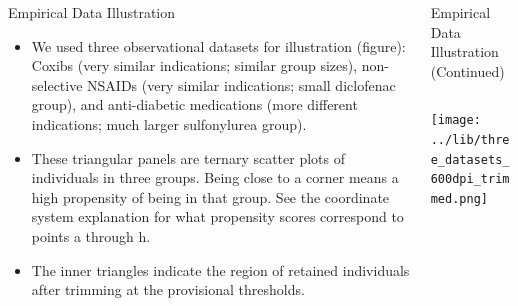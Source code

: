 \documentclass[final]{beamer}
\begin{document}
\begin{frame}[label={sec:org6cddcf1}]{}
\begin{columns}
\begin{column}[t]{0.48\columnwidth}
\begin{block}{Empirical Data Illustration}
\small
\begin{itemize}
\item We used three observational datasets for illustration (figure): Coxibs (very similar indications; similar group sizes), non-selective NSAIDs (very similar indications; small diclofenac group), and anti-diabetic medications (more different indications; much larger sulfonylurea group).
\item These triangular panels are ternary scatter plots of individuals in three groups. Being close to a corner means a high propensity of being in that group. See the coordinate system explanation for what propensity scores correspond to points a through h.
\item The inner triangles indicate the region of retained individuals after trimming at the provisional thresholds.
\end{itemize}
\end{block}
\end{column}


\begin{column}[t]{0.48\columnwidth}
\begin{block}{Empirical Data Illustration (Continued)}
\vspace{-2cm}
\begin{exampleblock}{}
\begin{columns}
\begin{column}{0.70\columnwidth}
\begin{center}
\texttt{[image: ../lib/three\_datasets\_600dpi\_trimmed.png]}
\end{center}
\end{column}


\end{columns}
\end{exampleblock}
\end{block}
\end{column}
\end{columns}
\end{frame}
\end{document}
